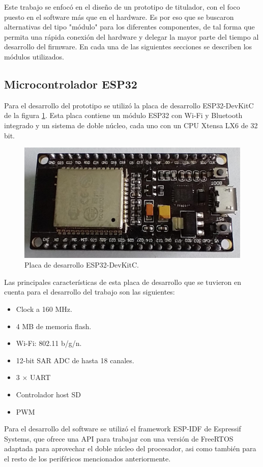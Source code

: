 Este trabajo se enfocó en el diseño de un prototipo de titulador, con el foco puesto en el software más que en el hardware. Es por eso que se buscaron alternativas del tipo "módulo" para los diferentes componentes, de tal forma que permita una rápida conexión del hardware y delegar la mayor parte del tiempo al desarrollo del firmware. En cada una de las siguientes secciones se describen los módulos utilizados.

\subsection{Microcontrolador ESP32}

Para el desarrollo del prototipo se utilizó la placa de desarrollo ESP32-DevKitC de la figura \ref{fig:ESP32.jpeg}. Esta placa contiene un módulo ESP32 con Wi-Fi y Bluetooth integrado y un sistema de doble núcleo, cada uno con un CPU Xtensa LX6 de 32 bit.

\begin{figure}[htbp]
	\centering
	\includegraphics[width=.4\textwidth]{./Figures/ESP32.jpeg}
	\caption{Placa de desarrollo ESP32-DevKitC.}
	\label{fig:ESP32.jpeg}
\end{figure}

Las principales características de esta placa de desarrollo que se tuvieron en cuenta para el desarrollo del trabajo son las siguientes:
	\begin{itemize}
		\item Clock a 160 MHz.
		\item 4 MB de memoria flash.
		\item Wi-Fi: 802.11 b/g/n.
		\item 12-bit SAR ADC de hasta 18 canales.
		\item 3 × UART
		\item Controlador host SD
		\item PWM
	\end{itemize}

Para el desarrollo del software se utilizó el framework ESP-IDF de Espressif Systems, que ofrece una API para trabajar con una versión de FreeRTOS adaptada para aprovechar el doble núcleo del procesador, asi como también para el resto de los periféricos mencionados anteriormente.

